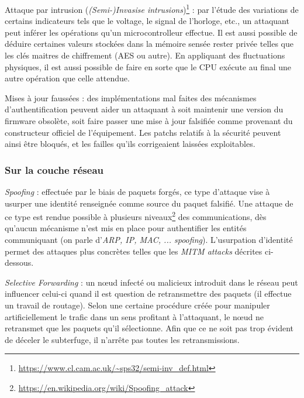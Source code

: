 \documentclass[]{article}
\begin{document}
\par Attaque par intrusion (\textit{(Semi-)Invasise intrusions})\footnote{\url{https://www.cl.cam.ac.uk/~sps32/semi-inv_def.html}} : par l'étude des variations de certains indicateurs tels que le voltage, le signal de l'horloge, etc., un attaquant peut inférer les opérations qu'un microcontrolleur effectue. Il est aussi possible de déduire certaines valeurs stockées dans la mémoire sensée rester privée telles que les clés maitres de chiffrement (AES ou autre). En appliquant des fluctuations physiques, il est aussi possible de faire en sorte que le CPU exécute au final une autre opération que celle attendue.\\

\par Mises à jour faussées : des implémentations mal faites des mécanismes d'authentification peuvent aider un attaquant à soit maintenir une version du firmware obsolète, soit faire passer une mise à jour falsifiée comme provenant du constructeur officiel de l'équipement. Les patchs relatifs à la sécurité peuvent ainsi être bloqués, et les failles qu'ils corrigeaient laissées exploitables.



\subsubsection{Sur la couche réseau}

\par \textit{Spoofing} : effectuée par le biais de paquets forgés, ce type d'attaque vise à usurper une identité renseignée comme source du paquet falsifié. Une attaque de ce type est rendue possible à plusieurs niveaux\footnote{\url{https://en.wikipedia.org/wiki/Spoofing_attack}} des communications, dès qu'aucun mécanisme n'est mis en place pour authentifier les entités communiquant (on parle d'\textit{ARP, IP, MAC, ... spoofing}). L'usurpation d'identité permet des attaques plus concrètes telles que les \textit{MITM attacks} décrites ci-dessous.\\

\par \textit{Selective Forwarding} : un nœud infecté ou malicieux introduit dans le réseau peut influencer celui-ci quand il est question de retransmettre des paquets (il effectue un travail de routage). Selon une certaine procédure créée pour manipuler artificiellement le trafic dans un sens profitant à l'attaquant, le nœud ne retransmet que les paquets qu'il sélectionne. Afin que ce ne soit pas trop évident de déceler le subterfuge, il n'arrête pas toutes les retransmissions.\\
\end{document}
